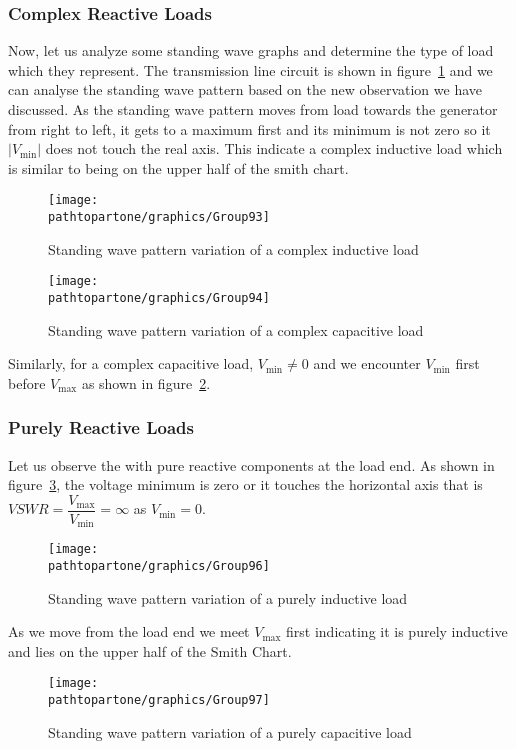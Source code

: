 \subsubsection{Complex Reactive Loads}
Now, let us analyze some standing wave graphs and determine the type of load which they represent. The transmission line circuit is shown in figure~\ref{fig:group93} and we can analyse the standing wave pattern based on the new observation we have discussed. As the standing wave pattern moves from load towards the generator from right to left, it gets to a maximum first and its minimum is not zero so it $|V_\min|$ does not touch the real axis. This indicate a complex inductive load which is similar to being on the upper half of the smith chart.
\begin{figure}[h]
\centering
\texttt{[image: \\pathtopartone/graphics/Group93]}
\caption{Standing wave pattern variation of a complex inductive load}
\label{fig:group93}
\end{figure}
\begin{figure}[h]
\centering
\texttt{[image: \\pathtopartone/graphics/Group94]}
\caption{Standing wave pattern variation of a complex capacitive load}
\label{fig:group94}
\end{figure}

Similarly, for a complex capacitive load, $V_\min\neq0$ and we encounter $V_\min$ first before $V_\max$ as shown in figure~\ref{fig:group94}. 

\subsubsection{Purely Reactive Loads}
Let us observe the  with pure reactive components at the load end. As shown in figure~\ref{fig:group96}, the voltage minimum is zero or it touches the horizontal axis that is ${VSWR=\dfrac{V_\max}{V_\min}=\infty}$ as ${V_\min=0}$.
\begin{figure}[h]
\centering
\texttt{[image: \\pathtopartone/graphics/Group96]}
\caption{Standing wave pattern variation of a purely inductive load}
\label{fig:group96}
\end{figure}

As we move from the load end we meet ${V_\max}$ first indicating it is purely inductive and lies on the upper half of the Smith Chart.
\begin{figure}[h]
\centering
\texttt{[image: \\pathtopartone/graphics/Group97]}
\caption{Standing wave pattern variation of a purely capacitive load}
\label{fig:group97}
\end{figure}

